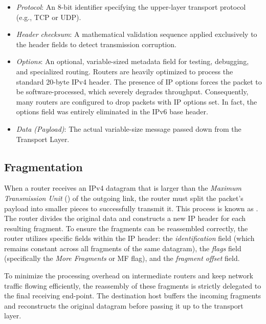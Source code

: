 \begin{itemize}
    \item \emph{Protocol}: An 8-bit identifier specifying the upper-layer transport protocol (e.g., TCP or UDP).
    \item \emph{Header checksum}: A mathematical validation sequence applied exclusively to the header fields to detect transmission corruption.
    \item \emph{Options}: An optional, variable-sized metadata field for testing, debugging, and specialized routing. Routers are heavily optimized to process the standard 20-byte IPv4 header.
    The presence of IP options forces the packet to be software-processed, which severely degrades throughput. Consequently, many routers are configured to drop packets with IP options set. In fact, the options field was entirely eliminated in the IPv6 base header.
    \item \emph{Data (Payload)}: The actual variable-size message passed down from the Transport Layer.
\end{itemize}

\subsection{Fragmentation}
When a router receives an IPv4 datagram that is larger than the \emph{Maximum Transmission Unit} () of the outgoing link, the router must split the packet's payload into smaller pieces to successfully transmit it. This process is known as  \cite{rfc791}. The router divides the original data and constructs a new IP header for each resulting fragment. To ensure the fragments can be reassembled correctly, the router utilizes specific fields within the IP header: the \emph{identification} field (which remains constant across all fragments of the same datagram), the \emph{flags} field (specifically the \emph{More Fragments} or MF flag), and the \emph{fragment offset} field. 

To minimize the processing overhead on intermediate routers and keep network traffic flowing efficiently, the reassembly of these fragments is strictly delegated to the final receiving end-point. The destination host buffers the incoming fragments and reconstructs the original datagram before passing it up to the transport layer.

